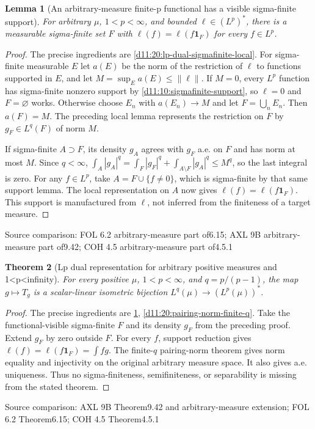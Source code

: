 \documentclass[11pt,oneside,openany]{book}
\newtheorem{theorem}{Theorem}[chapter]
\newtheorem{lemma}[theorem]{Lemma}
\theoremstyle{definition}
\theoremstyle{remark}
\newcommand{\one}{\mathbf1}\newcommand{\ind}[1]{\mathbf1_{#1}}
\newcommand{\family}[1]{}
\newcommand{\source}[1]{\par\begingroup\small\sffamily\color{black!65}Source comparison: #1\par\endgroup}
\begin{document}
\begin{lemma}[An arbitrary-measure finite-p functional has a visible sigma-finite support]\family{D11.20.functional_visible_sigmafinite_support}\label{d11:20:functional-visible-sigmafinite-support}
For arbitrary $\mu$, $1<p<\infty$, and bounded $\ell\in(L^p)^*$, there is a measurable sigma-finite set $F$ with $\ell(f)=\ell(f\one_F)$ for every $f\in L^p$.
\end{lemma}
\begin{proof}
The precise ingredients are \cref{d11:20:lp-dual-sigmafinite-local}. For sigma-finite measurable $E$ let $a(E)$ be the norm of the restriction of $\ell$ to functions supported in $E$, and let $M=\sup_E a(E)\le\|\ell\|$. If $M=0$, every $L^p$ function has sigma-finite nonzero support by \cref{d11:10:sigmafinite-support}, so $\ell=0$ and $F=\varnothing$ works. Otherwise choose $E_n$ with $a(E_n)\to M$ and let $F=\bigcup_nE_n$. Then $a(F)=M$. The preceding local lemma represents the restriction on $F$ by $g_F\in L^q(F)$ of norm $M$.

If sigma-finite $A\supset F$, its density $g_A$ agrees with $g_F$ a.e. on $F$ and has norm at most $M$. Since $q<\infty$,
$\int_A|g_A|^q=\int_F|g_F|^q+\int_{A\setminus F}|g_A|^q\le M^q$,
so the last integral is zero. For any $f\in L^p$, take $A=F\cup\{f\ne0\}$, which is sigma-finite by that same support lemma. The local representation on $A$ now gives $\ell(f)=\ell(f\one_F)$. This support is manufactured from $\ell$, not inferred from the finiteness of a target measure.
\end{proof}
\source{FOL 6.2 arbitrary-measure part of6.15; AXL 9B arbitrary-measure part of9.42; COH 4.5 arbitrary-measure part of4.5.1}

\begin{theorem}[Lp dual representation for arbitrary positive measures and 1<p<infinity]\family{D11.20.lp_dual_arbitrary_measure}\label{d11:20:lp-dual-arbitrary-measure}
For every positive $\mu$, $1<p<\infty$, and $q=p/(p-1)$, the map $g\mapsto T_g$ is a scalar-linear isometric bijection $L^q(\mu)\to(L^p(\mu))^*$.
\end{theorem}
\begin{proof}
The precise ingredients are \cref{d11:20:functional-visible-sigmafinite-support}, \cref{d11:20:pairing-norm-finite-q}. Take the functional-visible sigma-finite $F$ and its density $g_F$ from the preceding proof. Extend $g_F$ by zero outside $F$. For every $f$, support reduction gives $\ell(f)=\ell(f\one_F)=\int fg$. The finite-$q$ pairing-norm theorem gives norm equality and injectivity on the original arbitrary measure space. It also gives a.e. uniqueness. Thus no sigma-finiteness, semifiniteness, or separability is missing from the stated theorem.
\end{proof}
\source{AXL 9B Theorem9.42 and arbitrary-measure extension; FOL 6.2 Theorem6.15; COH 4.5 Theorem4.5.1}
\end{document}
